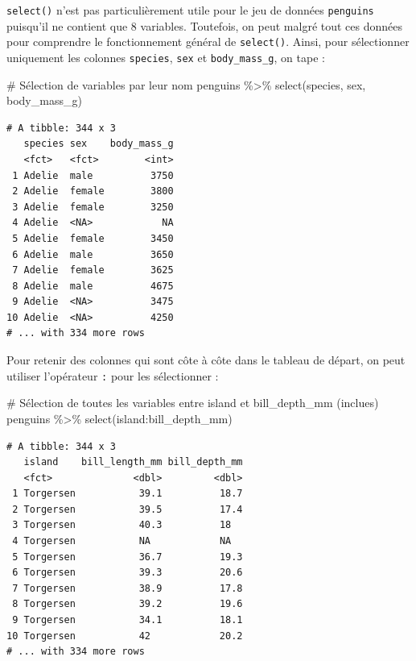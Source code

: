 \documentclass[
  letterpaper,
  DIV=11,
  numbers=noendperiod]{scrreprt}
\newenvironment{Shaded}{\begin{snugshade}}{\end{snugshade}}
\newcommand{\CommentTok}[1]{\textcolor[rgb]{0.37,0.37,0.37}{#1}}
\newcommand{\FunctionTok}[1]{\textcolor[rgb]{0.28,0.35,0.67}{#1}}
\newcommand{\NormalTok}[1]{\textcolor[rgb]{0.00,0.23,0.31}{#1}}
\newcommand{\SpecialCharTok}[1]{\textcolor[rgb]{0.37,0.37,0.37}{#1}}
\begin{document}
\texttt{select()} n'est pas particulièrement utile pour le jeu de
données \texttt{penguins} puisqu'il ne contient que 8 variables.
Toutefois, on peut malgré tout ces données pour comprendre le
fonctionnement général de \texttt{select()}. Ainsi, pour sélectionner
uniquement les colonnes \texttt{species}, \texttt{sex} et
\texttt{body\_mass\_g}, on tape :

\begin{Shaded}
\begin{Highlighting}[]
\CommentTok{\# Sélection de variables par leur nom}
\NormalTok{penguins }\SpecialCharTok{\%\textgreater{}\%}
  \FunctionTok{select}\NormalTok{(species, sex, body\_mass\_g)}
\end{Highlighting}
\end{Shaded}

\begin{verbatim}
# A tibble: 344 x 3
   species sex    body_mass_g
   <fct>   <fct>        <int>
 1 Adelie  male          3750
 2 Adelie  female        3800
 3 Adelie  female        3250
 4 Adelie  <NA>            NA
 5 Adelie  female        3450
 6 Adelie  male          3650
 7 Adelie  female        3625
 8 Adelie  male          4675
 9 Adelie  <NA>          3475
10 Adelie  <NA>          4250
# ... with 334 more rows
\end{verbatim}

Pour retenir des colonnes qui sont côte à côte dans le tableau de
départ, on peut utiliser l'opérateur \texttt{:} pour les sélectionner :

\begin{Shaded}
\begin{Highlighting}[]
\CommentTok{\# Sélection de toutes les variables entre \textasciigrave{}island\textasciigrave{} et \textasciigrave{}bill\_depth\_mm\textasciigrave{} (inclues)}
\NormalTok{penguins }\SpecialCharTok{\%\textgreater{}\%}
  \FunctionTok{select}\NormalTok{(island}\SpecialCharTok{:}\NormalTok{bill\_depth\_mm)}
\end{Highlighting}
\end{Shaded}

\begin{verbatim}
# A tibble: 344 x 3
   island    bill_length_mm bill_depth_mm
   <fct>              <dbl>         <dbl>
 1 Torgersen           39.1          18.7
 2 Torgersen           39.5          17.4
 3 Torgersen           40.3          18  
 4 Torgersen           NA            NA  
 5 Torgersen           36.7          19.3
 6 Torgersen           39.3          20.6
 7 Torgersen           38.9          17.8
 8 Torgersen           39.2          19.6
 9 Torgersen           34.1          18.1
10 Torgersen           42            20.2
# ... with 334 more rows
\end{verbatim}
\end{document}
